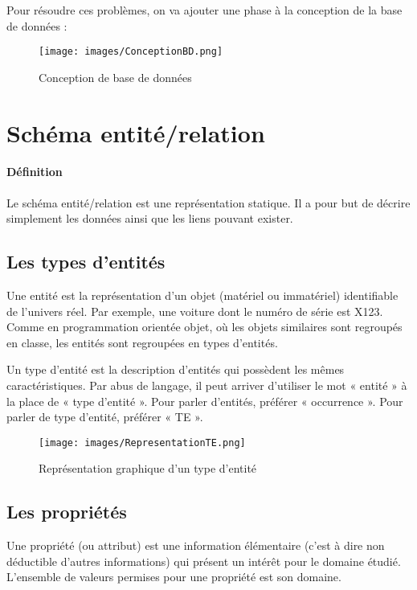 \documentclass[10pt]{article}
\begin{document}
	Pour résoudre ces problèmes, on va ajouter une phase à la conception de la base de données :\\
	\begin{figure}[H]
		\begin{center}
			\texttt{[image: images/ConceptionBD.png]}
		\end{center}
		\caption{Conception de base de données}
	\end{figure}
	
	\section{Schéma entité/relation}
		\paragraph{Définition} Le schéma entité/relation est une représentation statique. Il a pour but de décrire simplement les données ainsi que les liens pouvant exister.
			
		\subsection{Les types d'entités}
			Une entité est la représentation d'un objet (matériel ou immatériel) identifiable de l'univers réel. Par exemple, une voiture dont le numéro de série est X123. Comme en programmation orientée objet, où les objets similaires sont regroupés en classe, les entités sont regroupées en types d'entités.
			
			Un type d'entité est la description d'entités qui possèdent les mêmes caractéristiques. Par abus de langage, il peut arriver d'utiliser le mot « entité » à la place de « type d'entité ». Pour parler d'entités, préférer « occurrence ». Pour parler de type d'entité, préférer « TE ».
			
			\begin{figure}[H]
				\begin{center}
					\texttt{[image: images/RepresentationTE.png]}
				\end{center}
				\caption{Représentation graphique d'un type d'entité}
			\end{figure}
			
		\subsection{Les propriétés}
			Une propriété (ou attribut) est une information élémentaire (c'est à dire non déductible d'autres informations) qui présent un intérêt pour le domaine étudié. L'ensemble de valeurs permises pour une propriété est son domaine.
			
\end{document}
